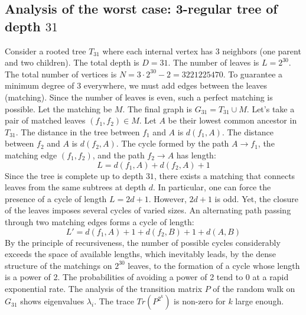 \documentclass[12pt,a4paper]{article}
\begin{document}
\subsection{Analysis of the worst case: 3-regular tree of depth $31$}
Consider a rooted tree $T_{31}$ where each internal vertex has 3 neighbors (one parent and two children).
The total depth is $D = 31$.
The number of leaves is $L = 2^{30}$.
The total number of vertices is $N = 3 \cdot 2^{30} - 2 = 3221225470$.
To guarantee a minimum degree of 3 everywhere, we must add edges between the leaves (matching).
Since the number of leaves is even, such a perfect matching is possible.
Let the matching be $M$. The final graph is $G_{31} = T_{31} \cup M$.
Let's take a pair of matched leaves $(f_1, f_2) \in M$.
Let $A$ be their lowest common ancestor in $T_{31}$.
The distance in the tree between $f_1$ and $A$ is $d(f_1, A)$.
The distance between $f_2$ and $A$ is $d(f_2, A)$.
The cycle formed by the path $A \to f_1$, the matching edge $(f_1, f_2)$, and the path $f_2 \to A$ has length:
$$ L = d(f_1, A) + d(f_2, A) + 1 $$
Since the tree is complete up to depth $31$, there exists a matching that connects leaves from the same subtrees at depth $d$.
In particular, one can force the presence of a cycle of length $L = 2d + 1$. However, $2d+1$ is odd.
Yet, the closure of the leaves imposes several cycles of varied sizes. An alternating path passing through two matching edges forms a cycle of length:
$$ L' = d(f_1, A) + 1 + d(f_2, B) + 1 + d(A, B) $$
By the principle of recursiveness, the number of possible cycles considerably exceeds the space of available lengths, which inevitably leads, by the dense structure of the matchings on $2^{30}$ leaves, to the formation of a cycle whose length is a power of 2. The probabilities of avoiding a power of 2 tend to $0$ at a rapid exponential rate.
The analysis of the transition matrix $P$ of the random walk on $G_{31}$ shows eigenvalues $\lambda_i$. The trace $Tr(P^{2^k})$ is non-zero for $k$ large enough.
\end{document}
